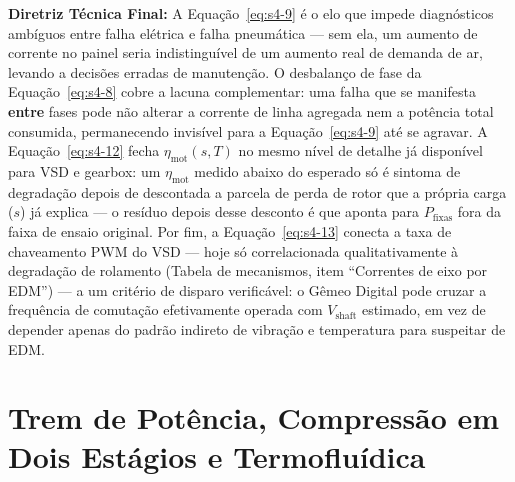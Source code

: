 \documentclass[12pt,a4paper]{article}
\numberwithin{equation}{section}
\numberwithin{table}{section}
\numberwithin{figure}{section}
\begin{document}
{	\textbf{Diretriz Técnica Final:} A Equação~\eqref{eq:s4-9} é o elo que impede diagnósticos ambíguos entre falha elétrica e falha pneumática — sem ela, um aumento de corrente no painel seria indistinguível de um aumento real de demanda de ar, levando a decisões erradas de manutenção. O desbalanço de fase da Equação~\eqref{eq:s4-8} cobre a lacuna complementar: uma falha que se manifesta \textbf{entre} fases pode não alterar a corrente de linha agregada nem a potência total consumida, permanecendo invisível para a Equação~\eqref{eq:s4-9} até se agravar. A Equação~\eqref{eq:s4-12} fecha $\eta_{\text{mot}}(s,T)$ no mesmo nível de detalhe já disponível para VSD e gearbox: um $\eta_{\text{mot}}$ medido abaixo do esperado só é sintoma de degradação depois de descontada a parcela de perda de rotor que a própria carga ($s$) já explica — o resíduo depois desse desconto é que aponta para $P_{\text{fixas}}$ fora da faixa de ensaio original. Por fim, a Equação~\eqref{eq:s4-13} conecta a taxa de chaveamento PWM do VSD — hoje só correlacionada qualitativamente à degradação de rolamento (Tabela de mecanismos, item ``Correntes de eixo por EDM'') — a um critério de disparo verificável: o Gêmeo Digital pode cruzar a frequência de comutação efetivamente operada com $V_{\text{shaft}}$ estimado, em vez de depender apenas do padrão indireto de vibração e temperatura para suspeitar de EDM.

	
	
	\clearpage
	\section{\textbf{Trem de Potência, Compressão em Dois Estágios e Termofluídica}}

}
\end{document}
